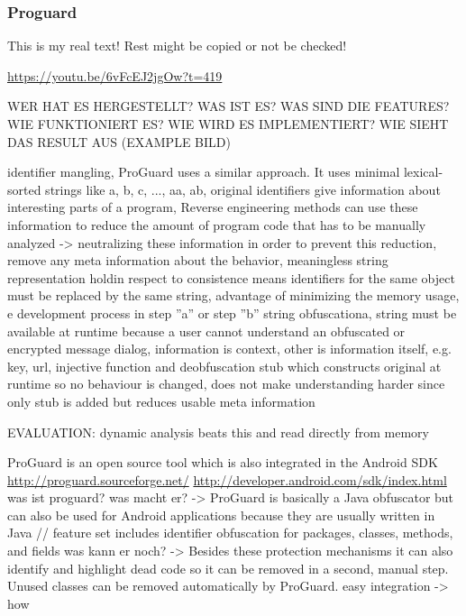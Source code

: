 \subsubsection{Proguard} \label{subsubsection:counter-reengineering-optobf-proguard}
This is my real text! Rest might be copied or not be checked!

\url{https://youtu.be/6vFcEJ2jgOw?t=419}\newline

WER HAT ES HERGESTELLT? WAS IST ES? WAS SIND DIE FEATURES? WIE FUNKTIONIERT ES? WIE WIRD ES IMPLEMENTIERT? WIE SIEHT DAS RESULT AUS (EXAMPLE BILD)\newline

%
identifier mangling, ProGuard uses a similar approach. It uses minimal
lexical-sorted strings like {a, b, c, ..., aa, ab}, original identifiers give information about interesting parts of a program, Reverse engineering methods can use these information to reduce the amount of program code that has to be manually analyzed ->  neutralizing these information
in order to prevent this reduction,  remove any meta information about the behavior, meaningless string representation holdin respect to consistence means identifiers for the same object must be replaced by the same string,
advantage of minimizing the memory usage, e development process in step ”a” or step ”b” \newline
string obfuscationa, string must be available at runtime because a user cannot
understand an obfuscated or encrypted message dialog, information is context, other is information itself, e.g. key, url, injective function and deobfuscation stub which constructs original at runtime so no behaviour is changed, does not make understanding harder since only stub is added but reduces usable meta information\newline
\cite{schulzLabCourse}
%


EVALUATION:  dynamic analysis beats this and read directly from memory\newline

ProGuard is an open source tool which is also integrated in the Android SDK
\url{http://proguard.sourceforge.net/}
\url{http://developer.android.com/sdk/index.html}\newline
was ist proguard? was macht er? -> ProGuard is basically a Java obfuscator but can also be used for Android applications because they are usually written in Java // feature set includes identifier obfuscation for packages, classes, methods, and fields\newline
was kann er noch? -> Besides these protection mechanisms it can also identify and highlight dead code so it can be removed in a second, manual step. Unused classes can be removed automatically by ProGuard.\newline
easy integration -> how\newline

